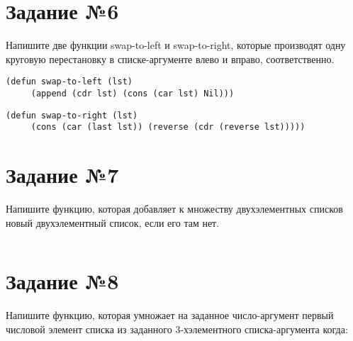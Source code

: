 \section{Задание №6}

Напишите две функции swap-to-left и swap-to-right, которые производят одну
круговую перестановку в списке-аргументе влево и вправо, соответственно.

\vspace{4mm}
\begin{minipage}{0.92\linewidth}
\begin{lstlisting}
(defun swap-to-left (lst)
     (append (cdr lst) (cons (car lst) Nil)))
\end{lstlisting}
\end{minipage}

\vspace{4mm}
\begin{minipage}{0.92\linewidth}
\begin{lstlisting}
(defun swap-to-right (lst)
     (cons (car (last lst)) (reverse (cdr (reverse lst)))))
\end{lstlisting}
\end{minipage}

\section{Задание №7}

Напишите функцию, которая добавляет к множеству двухэлементных списков
новый двухэлементный список, если его там нет.

\vspace{4mm}
\begin{minipage}{0.92\linewidth}
\begin{lstlisting}
\end{lstlisting}
\end{minipage}

\section{Задание №8}

Напишите функцию, которая умножает на заданное число-аргумент первый
числовой элемент списка из заданного 3-хэлементного списка-аргумента
когда:

